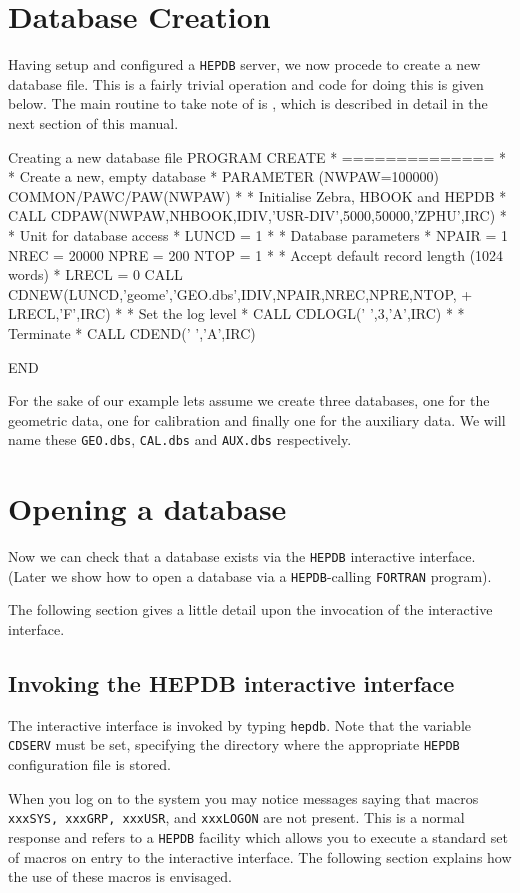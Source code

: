 \section{Database Creation}
Having setup and configured a {\tt HEPDB} server, we now procede to create
a new database file.
This is a fairly trivial operation and code for doing this is given below.
The main routine to take note of is , which is described in
detail in the next section of this manual.
%
\begin{XMPt}{Creating a new database file}
      PROGRAM CREATE
*     ==============
*
*     Create a new, empty database
*
      PARAMETER   (NWPAW=100000)
      COMMON/PAWC/PAW(NWPAW)
*
*     Initialise Zebra, HBOOK and HEPDB
*
      CALL CDPAW(NWPAW,NHBOOK,IDIV,'USR-DIV',5000,50000,'ZPHU',IRC)
*
*     Unit for database access
*
      LUNCD  = 1
*
*     Database parameters
*
      NPAIR  = 1
      NREC   = 20000
      NPRE   = 200
      NTOP   = 1
*
*     Accept default record length (1024 words)
*
      LRECL  = 0
      CALL CDNEW(LUNCD,'geome','GEO.dbs',IDIV,NPAIR,NREC,NPRE,NTOP,
     +           LRECL,'F',IRC)
*
*     Set the log level
*
      CALL CDLOGL(' ',3,'A',IRC)
*
*     Terminate
*
      CALL CDEND(' ','A',IRC)

      END
\end{XMPt}
%
For the sake of our example lets assume we create three databases, one for the
geometric data, one for calibration and finally one for the auxiliary data. We will
name these {\tt GEO.dbs}, {\tt CAL.dbs} and {\tt AUX.dbs} respectively.
%
\section{Opening a database}
Now we can check that a database exists via the {\tt HEPDB} interactive interface.
(Later we show how to open a database
via a {\tt HEPDB}-calling {\tt FORTRAN} program).
\par
The following section gives a little detail upon the invocation of the interactive
interface.
%
%
%
\subsection {Invoking the HEPDB interactive interface}
The interactive interface is invoked by typing {\tt hepdb}. Note that
the variable {\tt CDSERV} must be set, specifying the directory where the
appropriate {\tt HEPDB} configuration file is stored.

When you log on to the system you may notice messages saying that macros
{\tt xxxSYS, xxxGRP, xxxUSR}, and {\tt xxxLOGON} are not present. This is a normal response
and refers to a {\tt HEPDB} facility which allows you to execute a standard set of
macros on entry to the interactive interface. The following section explains
how the use of these macros is envisaged.
%
%
%
